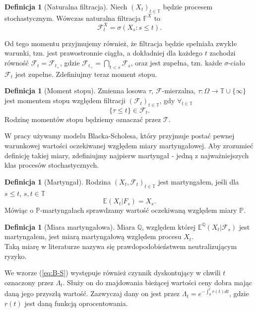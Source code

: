 \documentclass[]{pwr_wmat_praca_dyplomowa}
\theoremstyle{plain}
\numberwithin{theorem}{chapter}
\theoremstyle{definition}
\numberwithin{theorem}{chapter}
\newtheorem{definition}[theorem]{Definicja}
\begin{document}
\begin{definition}[Naturalna filtracja] 
Niech $(X_t)_{t \in \mathbb{T}}$ będzie procesem stochastycznym. Wówczas naturalna filtracja $\mathbb{F}^X$ to $$\mathcal{F}_t^X = \sigma(X_s: s \leq t).$$
\end{definition}

\noindent Od tego momentu przyjmujemy również, że filtracja będzie spełniała zwykłe warunki, tzn. jest prawostronnie ciągła, a dokładniej dla każdego $t$ zachodzi równość $\mathcal{F}_t = \mathcal{F}_{t_+}$, gdzie $\mathcal{F}_{t_+} = \bigcap_{t<s} \mathcal{F}_s$, oraz jest zupełna, tzn. każde $\sigma$-ciało $\mathcal{F}_t$ jest zupełne.
\newline
\newline
Zdefiniujmy teraz moment stopu.

\begin{definition}[Moment stopu]
Zmienna losowa $\tau$, $\mathcal{F}$-mierzalna, $\tau: \Omega \rightarrow \mathbb{T} \cup \{\infty\}$ jest momentem stopu względem filtracji $(\mathcal{F}_t)_{t \in \mathbb{T}}$, gdy $\forall_{t \in \mathbb{T}}$
$$ \{ \tau \leq t \} \in \mathcal{F}_t.$$ Rodzinę momentów stopu będziemy oznaczać przez $\mathcal{T}.$
\end{definition}

\noindent W pracy używamy modelu Blacka-Scholesa, który przyjmuje postać pewnej warunkowej wartości oczekiwanej względem miary martyngałowej. Aby zrozumieć definicję takiej miary, zdefiniujmy najpierw martyngał - jedną z najważniejszych klas procesów stochastycznych.

\begin{definition}[Martyngał]
Rodzina $(X_t,\mathcal{F}_t)_{t\in \mathbb{T}}$ jest martyngałem, jeśli dla $ s \leq t$, $s,t \in \mathbb{T}$ $$ \mathbb{E}(X_t|F_s) = X_s.$$
Mówiąc o $\mathbb{P}$-martyngałach sprawdzamy wartość oczekiwaną względem miary $\mathbb{P}$.
\end{definition}

\begin{definition}[Miara martyngałowa]
Miara $\mathbb{Q}$, względem której $\mathbb{E}^{\mathbb{Q}}(X_t|\mathcal{F}_s)$ jest martyngałem, jest miarą martyngałową względem procesu $X_t$.\\
Taką miarę w literaturze nazywa się prawdopodobieństwem neutralizującym ryzyko.
\end{definition}
 
We wzorze (\ref{eq:B-S}) występuje również czynnik dyskontujący w chwili $t$ oznaczony przez $\Lambda_t$. Służy on do znajdowania bieżącej wartości ceny dobra mając daną jego przyszłą wartość. Zazwyczaj dany on jest przez $\Lambda_t = e^{-\int_0^tr(t)dt}$, gdzie $r(t)$ jest daną funkcją oprocentowania.\\
\end{document}
